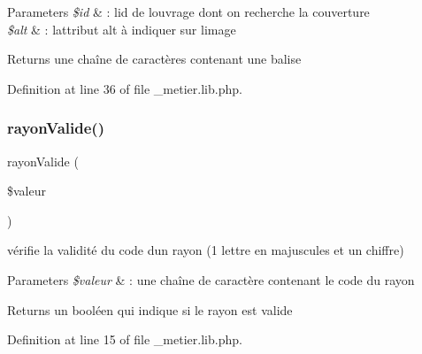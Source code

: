 \begin{DoxyParams}{Parameters}
{\em \$id} & \+: l\textquotesingle{}id de l\textquotesingle{}ouvrage dont on recherche la couverture \\
\hline
{\em \$alt} & \+: l\textquotesingle{}attribut alt à indiquer sur l\textquotesingle{}image \\
\hline
\end{DoxyParams}
\begin{DoxyReturn}{Returns}
une chaîne de caractères contenant une balise  
\end{DoxyReturn}


Definition at line 36 of file \+\_\+metier.\+lib.\+php.

\mbox{\label{__metier_8lib_8php_aec3ab89774c50691124093085120313c}} 
\subsubsection{\texorpdfstring{rayon\+Valide()}{rayonValide()}}
{\footnotesize\ttfamily rayon\+Valide (\begin{DoxyParamCaption}\item[{}]{\$valeur }\end{DoxyParamCaption})}

vérifie la validité du code d\textquotesingle{}un rayon (1 lettre en majuscules et un chiffre)


\begin{DoxyParams}{Parameters}
{\em \$valeur} & \+: une chaîne de caractère contenant le code du rayon \\
\hline
\end{DoxyParams}
\begin{DoxyReturn}{Returns}
un booléen qui indique si le rayon est valide 
\end{DoxyReturn}


Definition at line 15 of file \+\_\+metier.\+lib.\+php.

